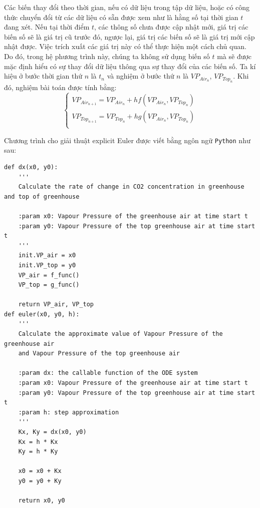 \documentclass[a4paper]{article}
\begin{document}
Các biến thay đổi theo thời gian, nếu có dữ liệu trong tập dữ liệu, hoặc có công thức chuyển đổi từ các dữ liệu có sẵn được xem như là hằng số tại thời gian $t$ đang xét. Nếu tại thời điểm $t$, các thông số chưa được cập nhật mới, giá trị các biến số sẽ là giá trị cũ trước đó, ngược lại, giá trị các biến số sẽ là giá trị mới cập nhật được. Việc trích xuất các giá trị này có thể thực hiện một cách chủ quan. Do đó, trong hệ phương trình này, chúng ta không sử dụng biến số $t$ mà sẽ được mặc định hiểu có sự thay đổi dữ liệu thông qua sự thay đổi của các biến số. Ta kí hiệu ở bước thời gian thứ $n$ là $t_n$ và nghiệm ở bước thứ $n$ là $VP_{Air_{n}}$, $VP_{Top_{n}}$. Khi đó, nghiệm bài toán được tính bằng:
\begin{equation}\label{eq:203}
\begin{cases}
    VP_{Air_{n+1}} = VP_{Air_{n}} + hf(VP_{Air_{n}}, VP_{Top_{n}}) \\
    VP_{Top_{n+1}} = VP_{Top_{n}} + hg(VP_{Air_{n}}, VP_{Top_{n}}) \\
\end{cases}
\end{equation}

Chương trình cho giải thuật explicit Euler được viết bằng ngôn ngữ \texttt{Python} như sau:

\begin{verbatim}
def dx(x0, y0):
    '''
    Calculate the rate of change in CO2 concentration in greenhouse and top of greenhouse

    :param x0: Vapour Pressure of the greenhouse air at time start t
    :param y0: Vapour Pressure of the top greenhouse air at time start t
    '''
    init.VP_air = x0
    init.VP_top = y0
    VP_air = f_func()
    VP_top = g_func()

    return VP_air, VP_top
def euler(x0, y0, h):
    '''
    Calculate the approximate value of Vapour Pressure of the greenhouse air
    and Vapour Pressure of the top greenhouse air

    :param dx: the callable function of the ODE system
    :param x0: Vapour Pressure of the greenhouse air at time start t
    :param y0: Vapour Pressure of the top greenhouse air at time start t
    :param h: step approximation
    '''
    Kx, Ky = dx(x0, y0)
    Kx = h * Kx
    Ky = h * Ky

    x0 = x0 + Kx
    y0 = y0 + Ky

    return x0, y0
\end{verbatim}
\end{document}
